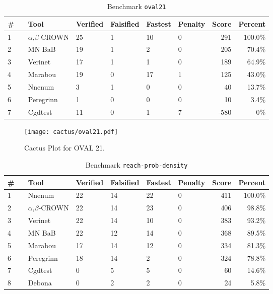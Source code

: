 \begin{table}[h]
\begin{center}
\caption{Benchmark \texttt{oval21}} \label{tab:cat_{cat}}
{\setlength{\tabcolsep}{2pt}
\begin{tabular}[h]{@{}llllllrr@{}}
\toprule
\textbf{\# ~} & \textbf{Tool} & \textbf{Verified} & \textbf{Falsified} & \textbf{Fastest} & \textbf{Penalty} & \textbf{Score} & \textbf{Percent}\\
\midrule
1 & $\alpha$,$\beta$-CROWN & 25 & 1 & 10 & 0 & 291 & 100.0\% \\
2 & MN BaB & 19 & 1 & 2 & 0 & 205 & 70.4\% \\
3 & Verinet & 17 & 1 & 1 & 0 & 189 & 64.9\% \\
4 & Marabou & 19 & 0 & 17 & 1 & 125 & 43.0\% \\
5 & Nnenum & 3 & 1 & 0 & 0 & 40 & 13.7\% \\
6 & Peregrinn & 1 & 0 & 0 & 0 & 10 & 3.4\% \\
7 & Cgdtest & 11 & 0 & 1 & 7 & -580 & 0\% \\
\bottomrule
\end{tabular}
}
\end{center}
\end{table}



\begin{figure}[h]
\centerline{\texttt{[image: cactus/oval21.pdf]}}
\caption{Cactus Plot for OVAL 21.}
\label{fig:quantPic}
\end{figure}



\begin{table}[h]
\begin{center}
\caption{Benchmark \texttt{reach-prob-density}} \label{tab:cat_{cat}}
{\setlength{\tabcolsep}{2pt}
\begin{tabular}[h]{@{}llllllrr@{}}
\toprule
\textbf{\# ~} & \textbf{Tool} & \textbf{Verified} & \textbf{Falsified} & \textbf{Fastest} & \textbf{Penalty} & \textbf{Score} & \textbf{Percent}\\
\midrule
1 & Nnenum & 22 & 14 & 22 & 0 & 411 & 100.0\% \\
2 & $\alpha$,$\beta$-CROWN & 22 & 14 & 23 & 0 & 406 & 98.8\% \\
3 & Verinet & 22 & 14 & 10 & 0 & 383 & 93.2\% \\
4 & MN BaB & 22 & 12 & 14 & 0 & 368 & 89.5\% \\
5 & Marabou & 17 & 14 & 12 & 0 & 334 & 81.3\% \\
6 & Peregrinn & 18 & 14 & 2 & 0 & 324 & 78.8\% \\
7 & Cgdtest & 0 & 5 & 5 & 0 & 60 & 14.6\% \\
8 & Debona & 0 & 2 & 2 & 0 & 24 & 5.8\% \\
\bottomrule
\end{tabular}
}
\end{center}
\end{table}



